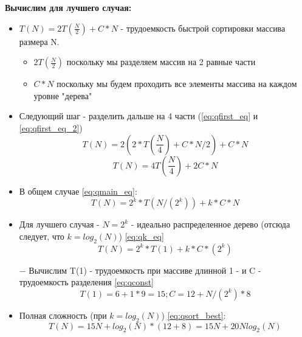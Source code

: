 \textbf{Вычислим для лучшего случая:}
\begin{itemize}
    \item $T(N) = 2T(\frac{N}{2}) + C*N$ - трудоемкость быстрой сортировки массива размера N.
    \begin{itemize}
        \item $2T(\frac{N}{2})$ поскольку мы разделяем массив на 2 равные части
        \item $C*N$ поскольку мы будем проходить все элементы массива на каждом уровне "дерева"
    \end{itemize}
    \item Следующий шаг - разделить дальше на 4 части (\eqref{eq:qfirst_eq} и \eqref{eq:qfirst_eq_2})
    \begin{equation}
        \label{eq:qfirst_eq}
        T(N) = 2(2*T(\frac{N}{4}) + C*N/2) + C*N
    \end{equation}
    \begin{equation}
        \label{eq:qfirst_eq_2}
        T(N) = 4T(\frac{N}{4}) + 2C*N
    \end{equation}
    \item В общем случае \eqref{eq:qmain_eq}:
    \begin{equation}
        \label{eq:qmain_eq}
        T(N) = 2^k * T(N/(2^k)) + k*C*N
    \end{equation}
    \item Для лучшего случая - $N = 2^k$ - идеально распределенное дерево (отсюда следует, что $k = log_2(N)$) \eqref{eq:qk_eq}
    \begin{equation}
        \label{eq:qk_eq}
        T(N) = 2^k * T(1) + k * C * (2^k)
    \end{equation}
    \item[$-$] Вычислим T(1) - трудоемкость при массиве длинной 1 - и C - трудоемкость разделения \eqref{eq:qconst}
    \begin{equation}
        \label{eq:qconst}
        T(1) = 6 + 1 * 9 = 15;
        C = 12 + N / (2^k) * 8
    \end{equation}
    \item Полная сложность (при $k = log_2(N)$) \eqref{eq:qsort_best}:
    \begin{equation}
        \label{eq:qsort_best}
        T(N) = 15N + log_2(N)*(12 + 8) = 15N + 20Nlog_2(N)
    \end{equation}
\end{itemize}

